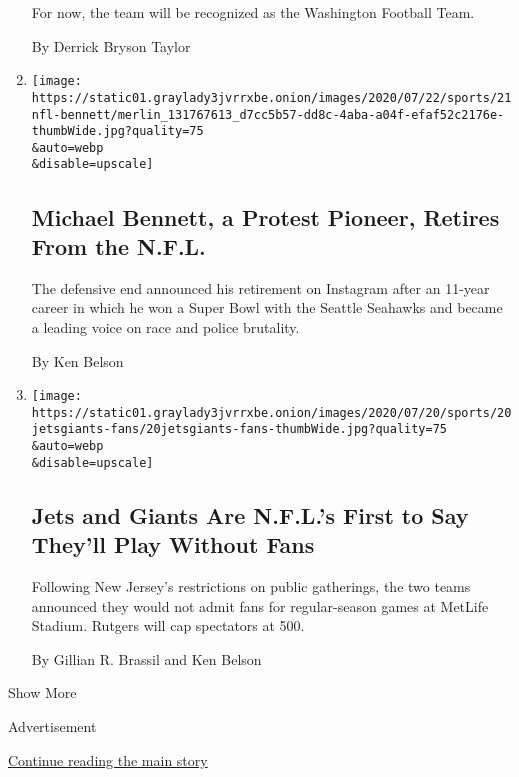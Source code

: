 \begin{enumerate}
  For now, the team will be recognized as the Washington Football Team.

  By Derrick Bryson Taylor
\item
  \href{/2020/07/21/sports/football/michael-bennett-retire-nfl.html}{}

  \texttt{[image: https://static01.graylady3jvrrxbe.onion/images/2020/07/22/sports/21nfl-bennett/merlin\_131767613\_d7cc5b57-dd8c-4aba-a04f-efaf52c2176e-thumbWide.jpg?quality=75\\\&auto=webp\\\&disable=upscale]}

  \hypertarget{michael-bennett-a-protest-pioneer-retires-from-the-nfl}{%
  \subsection{Michael Bennett, a Protest Pioneer, Retires From the
  N.F.L.}\label{michael-bennett-a-protest-pioneer-retires-from-the-nfl}}

  The defensive end announced his retirement on Instagram after an
  11-year career in which he won a Super Bowl with the Seattle Seahawks
  and became a leading voice on race and police brutality.

  By Ken Belson
\item
  \href{/2020/07/20/sports/football/jets-giants-rutgers-fans-metlife-stadium.html}{}

  \texttt{[image: https://static01.graylady3jvrrxbe.onion/images/2020/07/20/sports/20jetsgiants-fans/20jetsgiants-fans-thumbWide.jpg?quality=75\\\&auto=webp\\\&disable=upscale]}

  \hypertarget{jets-and-giants-are-nfls-first-to-say-theyll-play-without-fans}{%
  \subsection{Jets and Giants Are N.F.L.'s First to Say They'll Play
  Without
  Fans}\label{jets-and-giants-are-nfls-first-to-say-theyll-play-without-fans}}

  Following New Jersey's restrictions on public gatherings, the two
  teams announced they would not admit fans for regular-season games at
  MetLife Stadium. Rutgers will cap spectators at 500.

  By Gillian R. Brassil and Ken Belson
\end{enumerate}

Show More

Advertisement

\protect\hyperlink{after-mid1}{Continue reading the main story}

